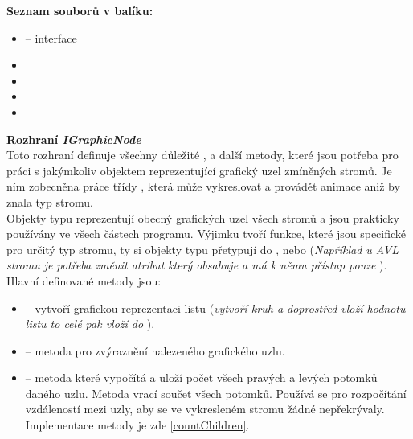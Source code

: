\documentclass[
  biblatex=false,
  font=serif,
  glossaries=false,
  tables=false,
  theorems=false,
  index
]{kidiplom}
\begin{document}
\noindent \textbf{Seznam souborů v balíku:}
\begin{itemize}
\item {} -- interface
\item {}
\item {}
\item {}
\item {}
\end{itemize}
\smallskip
\noindent \textbf{Rozhraní \textit{IGraphicNode}} \label{IGraphicNode}\\
\indent Toto rozhraní definuje všechny důležité ,  a další metody, které jsou potřeba pro práci s jakýmkoliv objektem reprezentující grafický uzel zmíněných stromů. Je ním zobecněna práce třídy , která může vykreslovat a provádět animace aniž by znala typ stromu.\\
\indent Objekty typu  reprezentují obecný grafických uzel všech stromů a jsou prakticky používány ve všech částech programu. Výjimku tvoří funkce, které jsou specifické pro určitý typ stromu, ty si objekty typu  přetypují do ,  nebo  (\textit{Například u AVL stromu je potřeba změnit atribut}  \textit{který obsahuje a má k němu přístup pouze} ).\\
\newpage
\noindent Hlavní definované metody jsou:
\begin{itemize}
\item {} -- vytvoří grafickou reprezentaci listu (\textit{vytvoří kruh a doprostřed vloží hodnotu listu to celé pak vloží do} ).
\item {} -- metoda pro zvýraznění nalezeného grafického uzlu.
\item {} -- metoda které vypočítá a uloží počet všech pravých a levých potomků daného uzlu. Metoda vrací součet všech potomků. Používá se pro rozpočítání vzdáleností mezi uzly, aby se ve vykresleném stromu žádné nepřekrývaly. Implementace metody je zde \ref{countChildren}.
\end{itemize}
\end{document}
